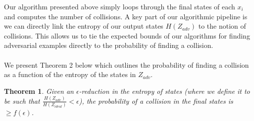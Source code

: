 \documentclass[letterpaper,twocolumn,10pt]{article}
\newtheorem{theorem}{Theorem}
\begin{document}
Our algorithm presented above simply loops through the final states of each $x_{i}$ and computes the number of collisions. A key part of our algorithmic pipeline is we can directly link the entropy of our output states $H(Z_{adv})$ to the notion of collisions. This allows us to tie the expected bounds of our algorithms for finding adversarial examples directly to the probability of finding a collision.  
\\
\\
We present Theorem 2 below which outlines the probability of finding a collision as a function of the entropy of the states in  $Z_{adv}$.


\begin{theorem}
Given an $\epsilon$-reduction in the entropy of states (where we define it to be such that $\frac{H(Z_{adv})}{H(Z_{ideal})} < \epsilon$), the probability of a collision in the final states is $\geq f(\epsilon)$. 
\end{theorem}
\end{document}
